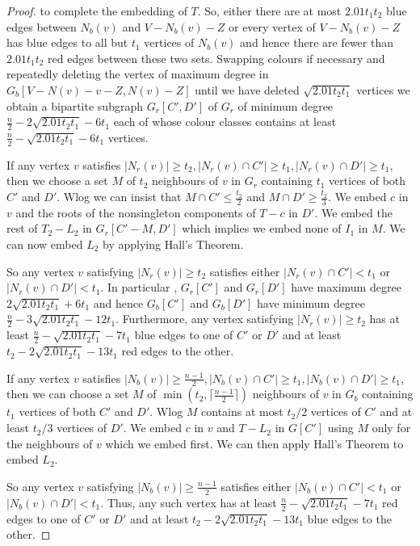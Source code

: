 \documentclass[11pt]{article}
\begin{document}
\begin{proof}
to complete the embedding of $T$.  So, either there are at most $2.01t_1t_2$ blue edges between $N_b(v)$ and $V-N_b(v)-Z$ or every 
vertex of $V-N_b(v)-Z$ has blue edges to all but $t_1$ vertices of $N_b(v)$ and hence there are fewer than 
$2.01t_1t_2$ red edges between these two sets. Swapping colours if necessary and repeatedly deleting the  vertex  of maximum  degree in 
$G_b[V-N(v)-v-Z,N(v)-Z]$ until we have deleted $\sqrt{2.01t_2t_1}$ vertices we obtain a bipartite subgraph $G_r[C',D']$ of $G_r$  of  minimum degree $\frac{n}{2}-2\sqrt{2.01t_2t_1}-6t_1$ each of whose colour classes contains at least 
$\frac{n}{2}-\sqrt{2.01t_2t_1}-6t_1$ vertices.

If any vertex $v$ satisfies $|N_r(v)| \ge t_2,|N_r(v) \cap C'| \ge t_1,|N_r(v) \cap D'| \ge t_1$,  then we  choose a set $M$ of $t_2$  neighbours of $v$ in $G_r$ containing $t_1$ vertices of both $C'$ and $D'$.
Wlog we can insist that $M \cap C' \le \frac{t_2}{2}$ and $M \cap D' \ge \frac{t_2}{3}$. We embed $c$ in $v$ and  the roots of the nonsingleton components 
of $T-c$ in $D'$. We embed  the rest of $T_2-L_2$ in $G_r[C'-M,D']$ which implies  we embed none of $I_1$ in $M$. We can 
now embed  $L_2$ by applying Hall's Theorem. 

So any vertex $v$ satisfying  $|N_r(v)| \ge t_2$ satisfies either $|N_r(v) \cap C'| <t_1$ or $|N_r(v) \cap D'| < t_1$. 
In particular , $G_r[C']$ and $G_r[D']$ have maximum degree $2\sqrt{2.01t_2t_1}+6t_1$ and hence 
$G_b[C']$ and $G_b[D']$ have minimum degree $\frac{n}{2}-3\sqrt{2.01t_2t_1}-12t_1$. Furthermore, 
any vertex satisfying  $|N_r(v)| \ge t_2$ has at least $\frac{n}{2}-\sqrt{2.01t_2t_1}-7t_1$ blue edges to one of 
$C'$ or $D'$ and at least $t_2-2\sqrt{2.01t_2t_1}-13t_1$ red edges to the other. 


If any vertex $v$ satisfies $|N_b(v)| \ge \frac{n-1}{2},|N_b(v) \cap C'| \ge t_1,|N_b(v) \cap D'| \ge t_1$, then we can choose 
a set $M$ of $\min(t_2,\lceil \frac{n-1}{2}\rceil)$ neighbours of $v$ in $ G_b$ containing $t_1$ vertices of both $C'$ and $D'$.  Wlog $M$  contains at most $t_2/2$ vertices of  $C'$ and at least $t_2/3$ vertices of $D'$. We embed $c$ in $v$ and $T-L_2$ in $G[C']$ using $M$ only for the neighbours of $v$ which 
we embed first. We can then apply Hall's Theorem to embed $L_2$.

So any vertex $v$ satisfying  $|N_b(v)| \ge \frac{n-1}{2}$ satisfies either $|N_b(v) \cap C'| <t_1$ or $|N_b(v) \cap D'| < t_1$. 
Thus, any such   vertex has at least $\frac{n}{2}-\sqrt{2.01t_2t_1}-7t_1$ red  edges to one of 
$C'$ or $D'$ and at least $t_2 -2\sqrt{2.01t_2t_1}-13t_1$ blue  edges to the other. 


\end{proof}
\end{document}
